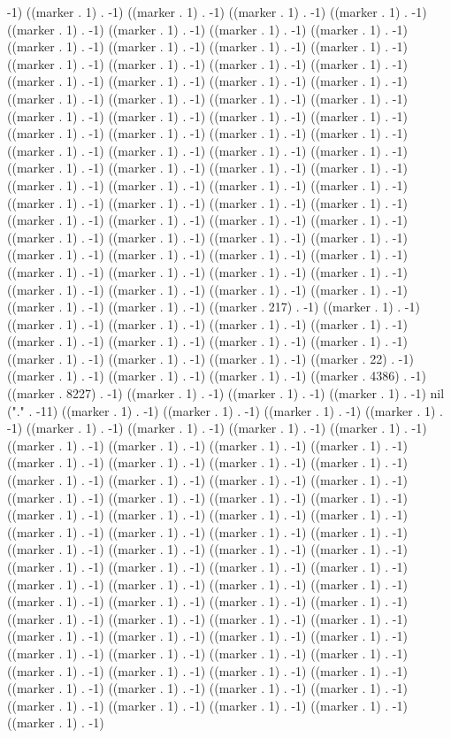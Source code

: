-1) ((marker . 1) . -1) ((marker . 1) . -1) ((marker . 1) . -1) ((marker . 1) . -1) ((marker . 1) . -1) ((marker . 1) . -1) ((marker . 1) . -1) ((marker . 1) . -1) ((marker . 1) . -1) ((marker . 1) . -1) ((marker . 1) . -1) ((marker . 1) . -1) ((marker . 1) . -1) ((marker . 1) . -1) ((marker . 1) . -1) ((marker . 1) . -1) ((marker . 1) . -1) ((marker . 1) . -1) ((marker . 1) . -1) ((marker . 1) . -1) ((marker . 1) . -1) ((marker . 1) . -1) ((marker . 1) . -1) ((marker . 1) . -1) ((marker . 1) . -1) ((marker . 1) . -1) ((marker . 1) . -1) ((marker . 1) . -1) ((marker . 1) . -1) ((marker . 1) . -1) ((marker . 1) . -1) ((marker . 1) . -1) ((marker . 1) . -1) ((marker . 1) . -1) ((marker . 1) . -1) ((marker . 1) . -1) ((marker . 1) . -1) ((marker . 1) . -1) ((marker . 1) . -1) ((marker . 1) . -1) ((marker . 1) . -1) ((marker . 1) . -1) ((marker . 1) . -1) ((marker . 1) . -1) ((marker . 1) . -1) ((marker . 1) . -1) ((marker . 1) . -1) ((marker . 1) . -1) ((marker . 1) . -1) ((marker . 1) . -1) ((marker . 1) . -1) ((marker . 1) . -1) ((marker . 1) . -1) ((marker . 1) . -1) ((marker . 1) . -1) ((marker . 1) . -1) ((marker . 1) . -1) ((marker . 1) . -1) ((marker . 1) . -1) ((marker . 1) . -1) ((marker . 1) . -1) ((marker . 1) . -1) ((marker . 1) . -1) ((marker . 1) . -1) ((marker . 1) . -1) ((marker . 1) . -1) ((marker . 1) . -1) ((marker . 1) . -1) ((marker . 1) . -1) ((marker . 1) . -1) ((marker . 217) . -1) ((marker . 1) . -1) ((marker . 1) . -1) ((marker . 1) . -1) ((marker . 1) . -1) ((marker . 1) . -1) ((marker . 1) . -1) ((marker . 1) . -1) ((marker . 1) . -1) ((marker . 1) . -1) ((marker . 1) . -1) ((marker . 1) . -1) ((marker . 1) . -1) ((marker . 22) . -1) ((marker . 1) . -1) ((marker . 1) . -1) ((marker . 1) . -1) ((marker . 4386) . -1) ((marker . 8227) . -1) ((marker . 1) . -1) ((marker . 1) . -1) ((marker . 1) . -1) nil ("." . -11) ((marker . 1) . -1) ((marker . 1) . -1) ((marker . 1) . -1) ((marker . 1) . -1) ((marker . 1) . -1) ((marker . 1) . -1) ((marker . 1) . -1) ((marker . 1) . -1) ((marker . 1) . -1) ((marker . 1) . -1) ((marker . 1) . -1) ((marker . 1) . -1) ((marker . 1) . -1) ((marker . 1) . -1) ((marker . 1) . -1) ((marker . 1) . -1) ((marker . 1) . -1) ((marker . 1) . -1) ((marker . 1) . -1) ((marker . 1) . -1) ((marker . 1) . -1) ((marker . 1) . -1) ((marker . 1) . -1) ((marker . 1) . -1) ((marker . 1) . -1) ((marker . 1) . -1) ((marker . 1) . -1) ((marker . 1) . -1) ((marker . 1) . -1) ((marker . 1) . -1) ((marker . 1) . -1) ((marker . 1) . -1) ((marker . 1) . -1) ((marker . 1) . -1) ((marker . 1) . -1) ((marker . 1) . -1) ((marker . 1) . -1) ((marker . 1) . -1) ((marker . 1) . -1) ((marker . 1) . -1) ((marker . 1) . -1) ((marker . 1) . -1) ((marker . 1) . -1) ((marker . 1) . -1) ((marker . 1) . -1) ((marker . 1) . -1) ((marker . 1) . -1) ((marker . 1) . -1) ((marker . 1) . -1) ((marker . 1) . -1) ((marker . 1) . -1) ((marker . 1) . -1) ((marker . 1) . -1) ((marker . 1) . -1) ((marker . 1) . -1) ((marker . 1) . -1) ((marker . 1) . -1) ((marker . 1) . -1) ((marker . 1) . -1) ((marker . 1) . -1) ((marker . 1) . -1) ((marker . 1) . -1) ((marker . 1) . -1) ((marker . 1) . -1) ((marker . 1) . -1) ((marker . 1) . -1) ((marker . 1) . -1) ((marker . 1) . -1) ((marker . 1) . -1) ((marker . 1) . -1) ((marker . 1) . -1) ((marker . 1) . -1) ((marker . 1) . -1) 